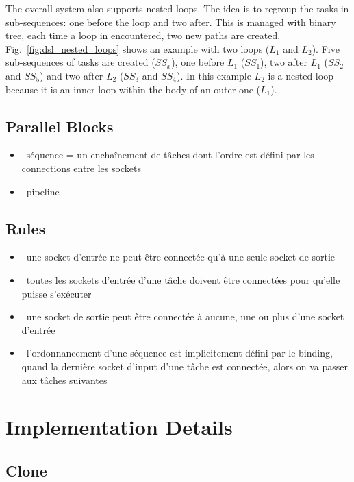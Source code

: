The overall system also supports nested loops. The idea is to regroup the tasks
in sub-sequences: one before the loop and two after. This is managed with binary
tree, each time a loop in encountered, two new paths are created.
Fig.~\ref{fig:dsl_nested_loops} shows an example with two loops ($L_1$ and
$L_2$). Five sub-sequences of tasks are created ($SS_x$), one before $L_1$
($SS_1$), two after $L_1$ ($SS_2$ and $SS_5$) and two after $L_2$ ($SS_3$ and
$SS_4$). In this example $L_2$ is a nested loop because it is an inner loop
within the body of an outer one ($L_1$).

\subsection{Parallel Blocks}

\begin{itemize}
  \item \xmark~séquence = un enchaînement de tâches dont l'ordre est défini par les
    connections entre les sockets
  \item \xmark~pipeline
\end{itemize}

\subsection{Rules}

\begin{itemize}
  \item \xmark~une socket d'entrée ne peut être connectée qu'à une seule socket de
    sortie
  \item \xmark~toutes les sockets d'entrée d'une tâche doivent être connectées pour
    qu'elle puisse s'exécuter
  \item \xmark~une socket de sortie peut être connectée à aucune, une ou plus d'une
    socket d'entrée
  \item \xmark~l'ordonnancement d'une séquence est implicitement défini par le binding,
    quand la dernière socket d'input d'une tâche est connectée, alors on va
    passer aux tâches suivantes
\end{itemize}

\section{Implementation Details}

\subsection{Clone}

